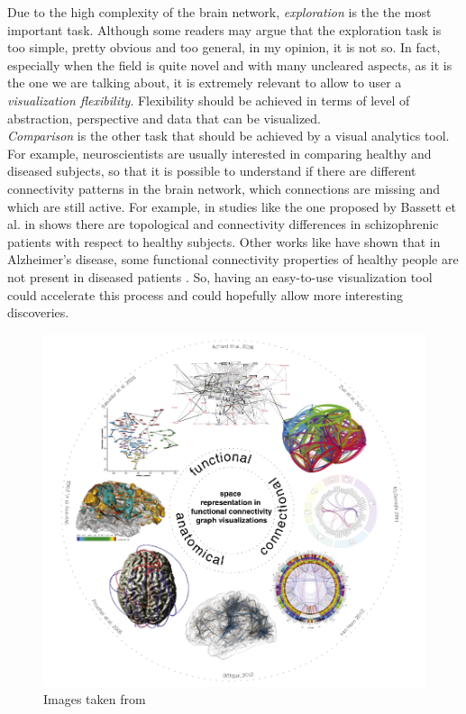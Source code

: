 \documentclass{article}
\begin{document}
\begin{multicols}{2}
Due to the high complexity of the brain network, \textit{exploration} is the the most important task. Although some readers may argue that the exploration task is too simple, pretty obvious and too general, in my opinion, it is not so. In fact, especially when the field is quite novel and with many uncleared aspects, as it is the one we are talking about, it is extremely relevant to allow to user a \textit{visualization flexibility}. Flexibility should be achieved in terms of level of abstraction, perspective and data that can be visualized. \\

\textit{Comparison} is the other task that should be achieved by a visual analytics tool. For example, neuroscientists are usually interested in comparing healthy and diseased subjects, so that it is possible to understand if there are different connectivity patterns in the brain network, which connections are missing and which are still active. For example, in studies like the one proposed by Bassett et al. in \cite{hierarchicalOrganization} shows there are topological and connectivity differences in schizophrenic patients with respect to healthy subjects. Other works like \cite{alzheimer} have shown that in Alzheimer's disease, some functional connectivity properties of healthy people are not present in diseased patients . So, having an easy-to-use visualization tool could accelerate this process and could hopefully allow more interesting discoveries.

\begin{figure}[ht]
\centering
\includegraphics[width = 1.8\columnwidth]{taxonomy}
\caption{Images taken from \cite{visualizingHumanConnectome}}
\label{fig:taxonomy}
\end{figure}


\end{multicols}
\end{document}
